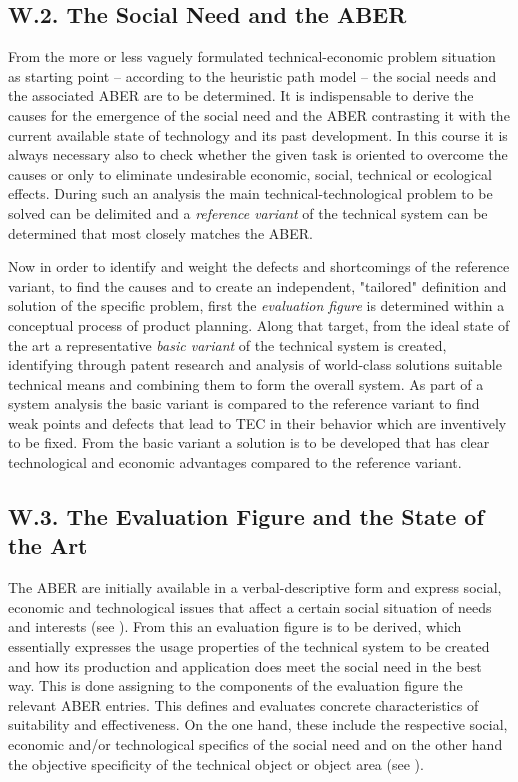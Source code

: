 \documentclass[11pt,a4paper]{article}
\begin{document}
\subsection*{W.2. The Social Need and the ABER}

From the more or less vaguely formulated technical-economic problem situation
as starting point -- according to the heuristic path model -- the social needs
and the associated ABER are to be determined. It is indispensable to derive
the causes for the emergence of the social need and the ABER contrasting it
with the current available state of technology and its past development.  In
this course it is always necessary also to check whether the given task is
oriented to overcome the causes or only to eliminate undesirable economic,
social, technical or ecological effects.  During such an analysis the main
technical-technological problem to be solved can be delimited and a
\emph{reference variant} of the technical system can be determined that most
closely matches the ABER.

Now in order to identify and weight the defects and shortcomings of the
reference variant, to find the causes and to create an independent, "tailored"
definition and solution of the specific problem, first the \emph{evaluation
  figure} is determined within a conceptual process of product planning. Along
that target, from the ideal state of the art a representative \emph{basic
  variant} of the technical system is created, identifying through patent
research and analysis of world-class solutions suitable technical means and
combining them to form the overall system. As part of a system analysis the
basic variant is compared to the reference variant to find weak points and
defects that lead to TEC in their behavior which are inventively to be fixed.
From the basic variant a solution is to be developed that has clear
technological and economic advantages compared to the reference variant.

\subsection*{W.3. The Evaluation Figure and the State of the Art}

The ABER are initially available in a verbal-descriptive form and express
social, economic and technological issues that affect a certain social
situation of needs and interests (see \cite[A.1]{RM-21}). From this an
evaluation figure is to be derived, which essentially expresses the usage
properties of the technical system to be created and how its production and
application does meet the social need in the best way. This is done assigning
to the components of the evaluation figure the relevant ABER entries. This
defines and evaluates concrete characteristics of suitability and
effectiveness. On the one hand, these include the respective social, economic
and/or technological specifics of the social need and on the other hand the
objective specificity of the technical object or object area (see
\cite[(1.3)]{RM-21}).
\end{document}
